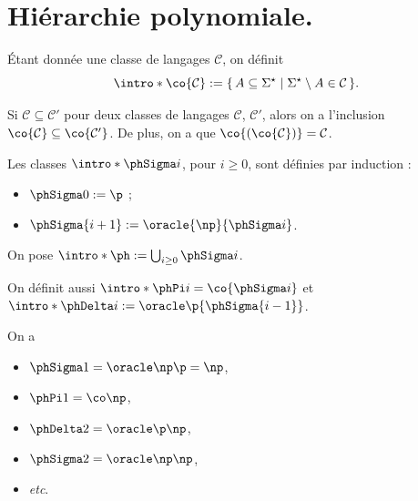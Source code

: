 \documentclass[./main]{subfiles}
\begin{document}
  \chapter{Hiérarchie polynomiale.}

  \begin{defn}
    Étant donnée une classe de langages $\mathcal{C}$, on définit
    \[
      \intro* \co{\mathcal{C}} := \mleft\{\,A \subseteq \Sigma^\star \;\middle|\; \Sigma^\star \setminus A \in \mathcal{C}\,\mright\}
    .\]
  \end{defn}

  \begin{rmk}
    Si $\mathcal{C} \subseteq \mathcal{C}'$ pour deux classes de langages $\mathcal{C}$, $\mathcal{C}'$, alors on a l'inclusion $\co{\mathcal{C}} \subseteq \co{\mathcal{C}'}$.
    De plus, on a que $\co{(\co{\mathcal{C}})} = \mathcal{C}$.
  \end{rmk}

  \begin{defn}
    Les classes $\intro* \phSigma i$, pour $i \ge 0$, sont définies par induction :
    \begin{itemize}
      \item $\phSigma 0 := \p$ ;
      \item $\phSigma {i+1} := \oracle{\np}{\phSigma i}$.
    \end{itemize}
    
    On pose $\intro*\ph := \bigcup_{i\ge 0} \phSigma i$.

    On définit aussi $\intro*\phPi i = \co {\phSigma i}$ et $\intro*\phDelta i := \oracle \p {\phSigma {i-1}}$.
  \end{defn}

  \begin{exm}
    On a
    \begin{itemize}
      \item $\phSigma 1 = \oracle \np \p = \np$,
      \item $\phPi 1 = \conp$,
      \item $\phDelta 2 = \oracle \p \np$,
      \item $\phSigma 2 = \oracle \np \np$,
      \item \textit{etc}.
    \end{itemize}
  \end{exm}
\end{document}

